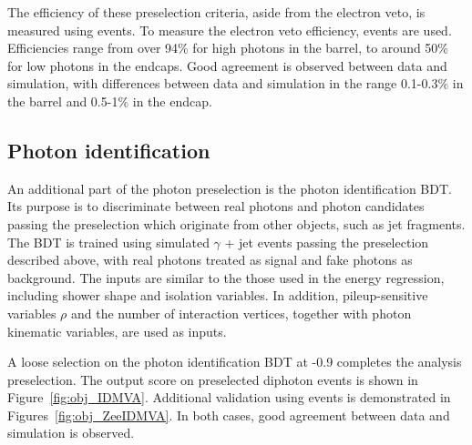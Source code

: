 The efficiency of these preselection criteria, aside from the electron veto, 
is measured using \Zee events.
To measure the electron veto efficiency, \Zmumug events are used.
Efficiencies range from over 94\% for high \RNINE photons in the barrel, 
to around 50\% for low \RNINE photons in the endcaps.
Good agreement is observed between data and simulation, 
with differences between data and simulation in the range 0.1-0.3\% in the barrel 
and 0.5-1\% in the endcap.

\subsection{Photon identification}
\label{sec:objects_PhotonIDBDT}

An additional part of the photon preselection is the photon identification BDT.
Its purpose is to discriminate between real photons and photon candidates passing the preselection which originate from other objects, 
such as jet fragments.
The BDT is trained using simulated $\gamma$ + jet events passing the preselection described above, with real photons treated as signal and fake photons as background.
The inputs are similar to the those used in the energy regression, 
including shower shape and isolation variables.
In addition, pileup-sensitive variables $\rho$ and the number of interaction vertices, 
together with photon kinematic variables, are used as inputs.

A loose selection on the photon identification BDT at -0.9 completes the analysis preselection.
The output score on preselected diphoton events is shown in Figure~\ref{fig:obj_IDMVA}.
Additional validation using \Zee events is demonstrated in Figures~\ref{fig:obj_ZeeIDMVA}.
In both cases, good agreement between data and simulation is observed.

